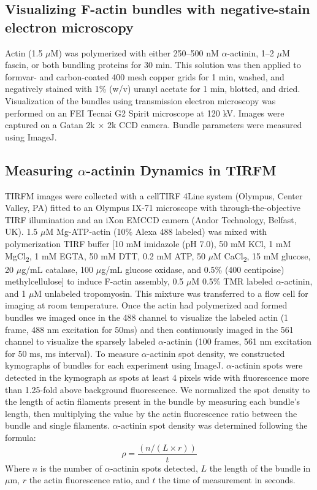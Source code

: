 \subsection{Visualizing F-actin bundles with negative-stain electron microscopy}
Actin (1.5 $\mu$M) was polymerized with either 250–500 nM $\alpha$-actinin, 1–2 $\mu$M fascin, or both bundling proteins for 30 min. This solution was then applied to formvar- and carbon-coated 400 mesh copper grids for 1 min, washed, and negatively stained with 1\% (w/v) uranyl acetate for 1 min, blotted, and dried. Visualization of the bundles using transmission electron microscopy was performed on an FEI Tecnai G2 Spirit microscope at 120 kV. Images were captured on a Gatan 2k $\times$ 2k CCD camera. Bundle parameters were measured using ImageJ.

\subsection{\texorpdfstring{Measuring $\alpha$}{a}-actinin Dynamics in TIRFM}
TIRFM images were collected with a cellTIRF 4Line system (Olympus, Center Valley, PA) fitted to an Olympus IX-71 microscope with through-the-objective TIRF illumination and an iXon EMCCD camera (Andor Technology, Belfast, UK). 1.5 $\mu$M Mg-ATP-actin (10\% Alexa 488 labeled) was mixed with polymerization TIRF buffer [10 mM imidazole (pH 7.0), 50 mM KCl, 1 mM MgCl\textsubscript{2}, 1 mM EGTA, 50 mM DTT, 0.2 mM ATP, 50 $\mu$M CaCl\textsubscript{2}, 15 mM glucose, 20 $\mu$g/mL catalase, 100 $\mu$g/mL glucose oxidase, and 0.5\% (400 centipoise) methylcellulose] to induce F-actin assembly, 0.5 $\mu$M 0.5\% TMR labeled $\alpha$-actinin, and 1 $\mu$M unlabeled tropomyosin. This mixture was transferred to a flow cell for imaging at room temperature. Once the actin had polymerized and formed bundles we imaged once in the 488 channel to visualize the labeled actin (1 frame, 488 nm excitation for 50ms) and then continuously imaged in the 561 channel to visualize the sparsely labeled $\alpha$-actinin (100 frames, 561 nm excitation for 50 ms,  ms interval).
To measure $\alpha$-actinin spot density, we constructed kymographs of bundles for each experiment using ImageJ. $\alpha$-actinin spots were detected in the kymograph as spots at least 4 pixels wide with fluorescence more than 1.25-fold above background fluorescence. We normalized the spot density to the length of actin filaments present in the bundle by measuring each bundle's length, then multiplying the value by the actin fluorescence ratio between the bundle and single filaments. $\alpha$-actinin spot density was determined following the formula: 
\[\rho = \frac{(n/(L\times r))}{t}\]
Where $n$ is the number of $\alpha$-actinin spots detected, $L$ the length of the bundle in $\mu$m, $r$ the actin fluorescence ratio, and $t$ the time of measurement in seconds.


